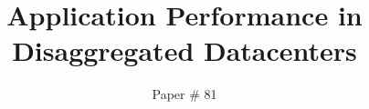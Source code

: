 \documentclass[10pt,twocolumn]{article}
\begin{document}
\title{\bf Application Performance in Disaggregated Datacenters}
\author{Paper \# 81}
\date{}
\maketitle
\thispagestyle{empty}





%

%

%







\end{document}
